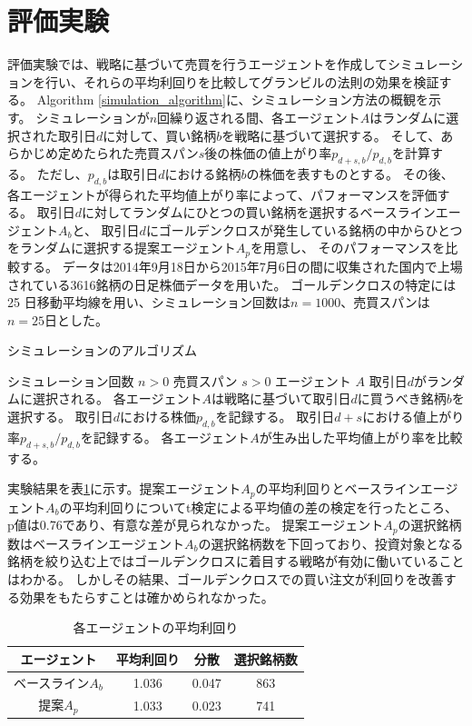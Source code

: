 \documentclass[twocolumn,jsaiac]{jarticle}
\begin{document}
\section{評価実験}
評価実験では、戦略に基づいて売買を行うエージェントを作成してシミュレーションを行い、それらの平均利回りを比較してグランビルの法則の効果を検証する。
Algorithm \ref{simulation_algorithm}に、シミュレーション方法の概観を示す。
シミュレーションが$n$回繰り返される間、各エージェント$A$はランダムに選択された取引日$d$に対して、買い銘柄$b$を戦略に基づいて選択する。
そして、あらかじめ定めたられた売買スパン$s$後の株価の値上がり率$p_{d+s,b}/p_{d,b}$を計算する。
ただし、$p_{d,b}$は取引日$d$における銘柄$b$の株価を表すものとする。
その後、各エージェントが得られた平均値上がり率によって、パフォーマンスを評価する。
取引日$d$に対してランダムにひとつの買い銘柄を選択するベースラインエージェント$A_b$と、
取引日$d$にゴールデンクロスが発生している銘柄の中からひとつをランダムに選択する提案エージェント$A_p$を用意し、
そのパフォーマンスを比較する。
データは2014年9月18日から2015年7月6日の間に収集された国内で上場されている3616銘柄の日足株価データを用いた。
ゴールデンクロスの特定には 25 日移動平均線を用い、シミュレーション回数は$n=1000$、売買スパンは$n=25$日とした。
\begin{algorithm}
\caption{シミュレーションのアルゴリズム}
\label{simulation_algorithm}
\begin{algorithmic}
\REQUIRE シミュレーション回数 $n > 0$
\REQUIRE 売買スパン $s > 0$
\REQUIRE エージェント $A$
\STATE 取引日$d$がランダムに選択される。
\STATE 各エージェント$A$は戦略に基づいて取引日$d$に買うべき銘柄$b$を選択する。
\STATE 取引日$d$における株価$p_{d,b}$を記録する。
\STATE 取引日$d+s$における値上がり率$p_{d+s,b}/p_{d,b}$を記録する。
\ENDFOR
\STATE 各エージェント$A$が生み出した平均値上がり率を比較する。
\end{algorithmic}
\end{algorithm}

実験結果を表\ref{tbl:result}に示す。提案エージェント$A_p$の平均利回りとベースラインエージェント$A_b$の平均利回りについてt検定による平均値の差の検定を行ったところ、
p値は0.76であり、有意な差が見られなかった。
提案エージェント$A_p$の選択銘柄数はベースラインエージェント$A_b$の選択銘柄数を下回っており、投資対象となる銘柄を絞り込む上ではゴールデンクロスに着目する戦略が有効に働いていることはわかる。
しかしその結果、ゴールデンクロスでの買い注文が利回りを改善する効果をもたらすことは確かめられなかった。
\begin{table}[htb]
\caption{各エージェントの平均利回り}
\label{tbl:result}
\begin{tabular}{c|c|c|c}
エージェント & 平均利回り & 分散 & 選択銘柄数 \\\hline\hline
ベースライン$A_b$ & 1.036 & 0.047 & 863 \\\hline
提案$A_p$ & 1.033 & 0.023 & 741\\\hline
\end{tabular}
\end{table}
\end{document}
